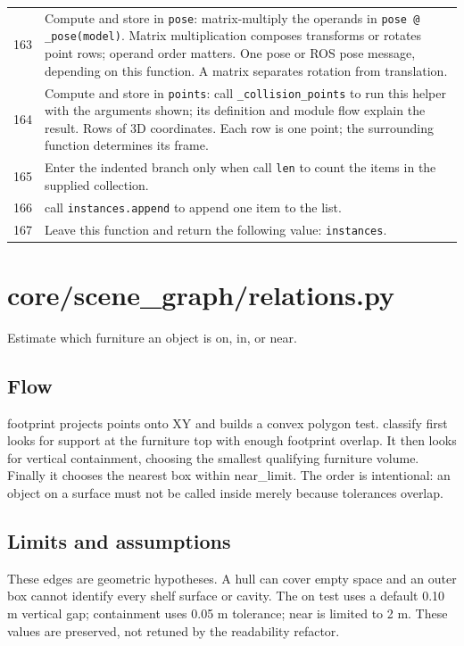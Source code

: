 \documentclass[11pt,a4paper]{book}
\begin{document}
\begin{longtable}{r p{}}
163 & Compute and store in \texttt{pose}: matrix-multiply the operands in \texttt{pose @ \_pose(model)}. Matrix multiplication composes transforms or rotates point rows; operand order matters. One pose or ROS pose message, depending on this function. A matrix separates rotation from translation. \\

164 & Compute and store in \texttt{points}: call \texttt{\_collision\_points} to run this helper with the arguments shown; its definition and module flow explain the result. Rows of 3D coordinates. Each row is one point; the surrounding function determines its frame. \\

165 & Enter the indented branch only when call \texttt{len} to count the items in the supplied collection. \\

166 & call \texttt{instances.append} to append one item to the list. \\

167 & Leave this function and return the following value: \texttt{instances}. \\

\end{longtable}

\chapter{core/scene\_graph/relations.py}

Estimate which furniture an object is on, in, or near.

\section*{Flow}

footprint projects points onto XY and builds a convex polygon test. classify first looks for support at the furniture top with enough footprint overlap. It then looks for vertical containment, choosing the smallest qualifying furniture volume. Finally it chooses the nearest box within near\_limit. The order is intentional: an object on a surface must not be called inside merely because tolerances overlap.

\section*{Limits and assumptions}

These edges are geometric hypotheses. A hull can cover empty space and an outer box cannot identify every shelf surface or cavity. The on test uses a default 0.10 m vertical gap; containment uses 0.05 m tolerance; near is limited to 2 m. These values are preserved, not retuned by the readability refactor.
\end{document}
